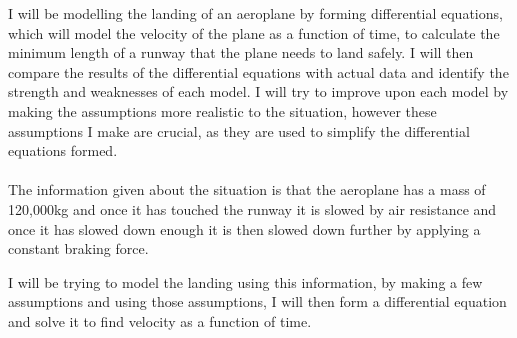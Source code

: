 I will be modelling the landing of an aeroplane by forming differential equations, which will model the velocity of the plane as a function of time, to calculate the minimum length of a runway that the plane needs to land safely. I will then compare the results of the differential equations with actual data and identify the strength and weaknesses of each model. I will try to improve upon each model by making the assumptions more realistic to the situation, however these assumptions I make are crucial, as they are used to simplify the differential equations formed.
\\\\
The information given about the situation is that the aeroplane has a mass of 120,000kg and once it has touched the runway it is slowed by air resistance and once it has slowed down enough it is then slowed down further by applying a constant braking force.

I will be trying to model the landing using this information, by making a few assumptions and using those assumptions, I will then form a differential equation and solve it to find velocity as a function of time.